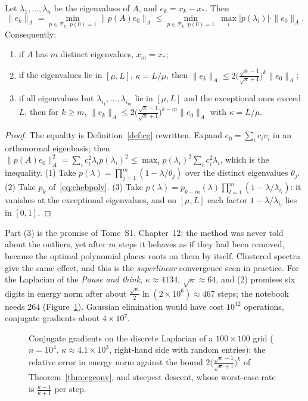 \begin{theorem}\label{thm:cgconv}
Let $\lambda_1,\dots,\lambda_n$ be the eigenvalues of $A$, and $e_k=x_k-x_*$. Then
\[
\|e_k\|_A=\min_{p\in\mathcal P_k,\,p(0)=1}\|p(A)e_0\|_A\le\min_{p\in\mathcal P_k,\,p(0)=1}\ \max_i|p(\lambda_i)|\cdot\|e_0\|_A.
\]
Consequently:
\begin{enumerate}
\item if $A$ has $m$ distinct eigenvalues, $x_m=x_*$;
\item if the eigenvalues lie in $[\mu,L]$, $\kappa=L/\mu$, then $\|e_k\|_A\le2\bigl(\frac{\sqrt\kappa-1}{\sqrt\kappa+1}\bigr)^k\|e_0\|_A$;
\item if all eigenvalues but $\lambda_{i_1},\dots,\lambda_{i_m}$ lie in $[\mu,L]$ and the exceptional ones exceed $L$, then for $k\ge m$,
$\|e_k\|_A\le2\bigl(\frac{\sqrt{\kappa}-1}{\sqrt{\kappa}+1}\bigr)^{k-m}\|e_0\|_A$ with $\kappa=L/\mu$.
\end{enumerate}
\end{theorem}
\begin{proof}
The equality is Definition~\ref{def:cg} rewritten. Expand $e_0=\sum_ic_iv_i$ in an orthonormal eigenbasis; then $\|p(A)e_0\|_A^2=\sum_ic_i^2\lambda_ip(\lambda_i)^2\le\max_ip(\lambda_i)^2\sum_ic_i^2\lambda_i$,
which is the inequality. (1) Take $p(\lambda)=\prod_{j=1}^m(1-\lambda/\theta_j)$ over the distinct eigenvalues $\theta_j$. (2) Take $p_k$ of~\eqref{eq:chebpoly}. (3) Take
$p(\lambda)=p_{k-m}(\lambda)\prod_{l=1}^m(1-\lambda/\lambda_{i_l})$: it vanishes at the exceptional eigenvalues, and on $[\mu,L]$ each factor $1-\lambda/\lambda_{i_l}$ lies in $[0,1]$.
\end{proof}

Part (3) is the promise of Tome~S1, Chapter~12: the method was never told about the outliers, yet after $m$ steps it behaves as if they had been removed,
because the optimal polynomial places roots on them by itself. Clustered spectra give the same effect, and this is the \emph{superlinear} convergence
seen in practice. For the Laplacian of the \emph{Pause and think}, $\kappa\approx4134$, $\sqrt\kappa\approx64$, and (2) promises six digits in energy norm after about
$\frac{\sqrt\kappa}2\ln(2\times10^6)\approx467$ steps; the notebook needs $264$ (Figure~\ref{fig:cgconv}). Gaussian elimination would have
cost $10^{12}$ operations, conjugate gradients about $4\times10^7$.

\begin{figure}[ht]
\centering
{}
\caption{Conjugate gradients on the discrete Laplacian of a $100\times100$ grid ($n=10^4$, $\kappa\approx4.1\times10^3$, right-hand side with random entries): the relative error in energy norm against the
bound $2\bigl(\frac{\sqrt\kappa-1}{\sqrt\kappa+1}\bigr)^k$ of Theorem~\ref{thm:cgconv}, and steepest descent, whose worst-case rate is $\frac{\kappa-1}{\kappa+1}$ per step.}
\label{fig:cgconv}
\end{figure}

